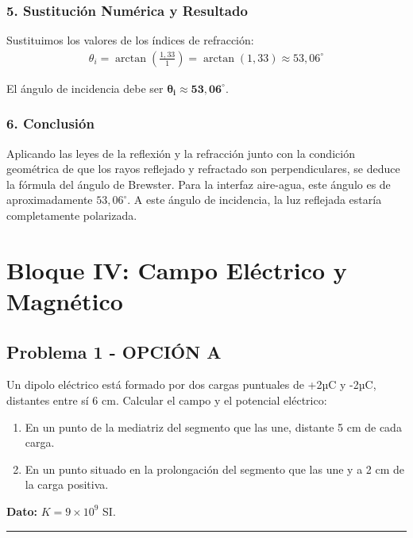 \subsubsection*{5. Sustitución Numérica y Resultado}
Sustituimos los valores de los índices de refracción:
\begin{gather}
    \theta_i = \arctan\left(\frac{1,33}{1}\right) = \arctan(1,33) \approx 53,06^\circ
\end{gather}
\begin{cajaresultado}
    El ángulo de incidencia debe ser $\boldsymbol{\theta_i \approx 53,06^\circ}$.
\end{cajaresultado}

\subsubsection*{6. Conclusión}
\begin{cajaconclusion}
Aplicando las leyes de la reflexión y la refracción junto con la condición geométrica de que los rayos reflejado y refractado son perpendiculares, se deduce la fórmula del ángulo de Brewster. Para la interfaz aire-agua, este ángulo es de aproximadamente $53,06^\circ$. A este ángulo de incidencia, la luz reflejada estaría completamente polarizada.
\end{cajaconclusion}

\newpage

\section{Bloque IV: Campo Eléctrico y Magnético}
\label{sec:em_2000_jun_ord}

\subsection{Problema 1 - OPCIÓN A}
\label{subsec:4A_2000_jun_ord}

\begin{cajaenunciado}
Un dipolo eléctrico está formado por dos cargas puntuales de +2µC y -2µC, distantes entre sí 6 cm. Calcular el campo y el potencial eléctrico:
\begin{enumerate}
    \item En un punto de la mediatriz del segmento que las une, distante 5 cm de cada carga.
    \item En un punto situado en la prolongación del segmento que las une y a 2 cm de la carga positiva.
\end{enumerate}
\textbf{Dato:} $K=9\times10^{9}$ SI.
\end{cajaenunciado}
\hrule

